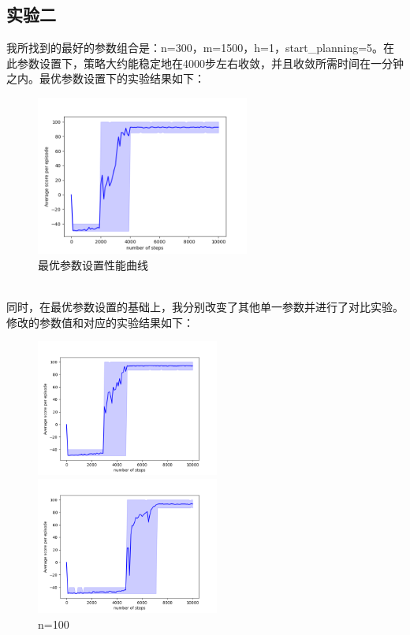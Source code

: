 \documentclass[a4paper,12pt]{article}
\begin{document}
\begin{CJK}{UTF8}{gbsn}
\subsection{实验二}
我所找到的最好的参数组合是：n=300，m=1500，h=1，start\_planning=5。在此参数设置下，策略大约能稳定地在4000步左右收敛，并且收敛所需时间在一分钟之内。最优参数设置下的实验结果如下：
\begin{figure}[h!]
	\vspace{-0.3cm}
	\centering
	\includegraphics[width=7cm]{resource/n=300-m=1500-h=1-sp=5/performance.png}
	\caption{最优参数设置性能曲线}
\end{figure}
\\
同时，在最优参数设置的基础上，我分别改变了其他单一参数并进行了对比实验。修改的参数值和对应的实验结果如下：
\begin{figure}[htbp]
	\vspace{-0.3cm}
	\centering
	\begin{minipage}[t]{0.45\textwidth}
		\centering
		\includegraphics[width=6cm]{resource/n=100-m=1500-h=1-sp=5/performance.png}
		\caption{n=100}
	\end{minipage}
	\begin{minipage}[t]{0.45\textwidth}
		\centering
		\includegraphics[width=6cm]{resource/n=300-m=500-h=1-sp=5/performance.png}

\end{minipage}
\end{figure}
\end{CJK}
\end{document}
